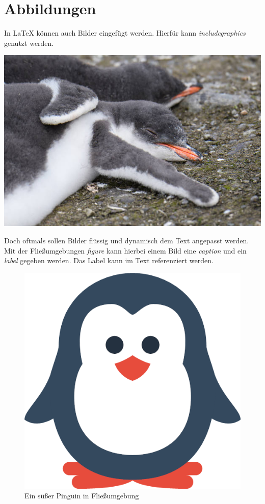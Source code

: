 \section{Abbildungen}
In LaTeX können auch Bilder eingefügt werden. Hierfür kann \textit{includegraphics} genutzt werden.

\includegraphics[scale=0.8]{penguin-sleeping.jpg}

Doch oftmals sollen Bilder flüssig und dynamisch dem Text angepasst werden. Mit der Fließumgebungen \textit{figure} kann hierbei einem Bild eine \textit{caption} und ein \textit{label} gegeben werden. Das Label kann im Text referenziert werden.

\begin{figure}
    \includegraphics[scale=0.3]{penguin.png}
    \caption{Ein süßer Pinguin in Fließumgebung}
    \label{fig.pinguin}
\end{figure}

